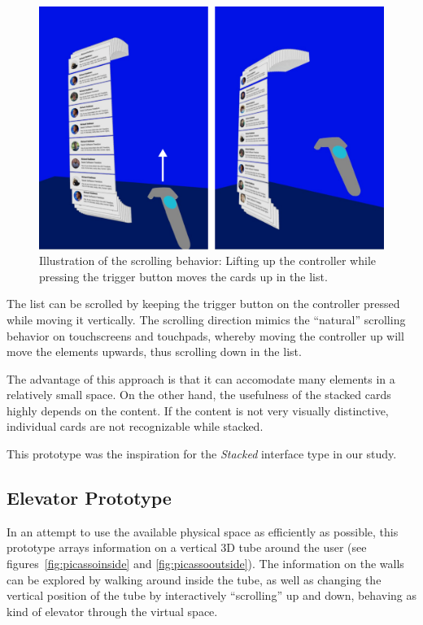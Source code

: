 \documentclass[nobib]{tufte-book} %
\begin{document}
\begin{figure}
  \includegraphics{emailscroll.png}
  \caption{Illustration of the scrolling behavior: Lifting up the controller while pressing the trigger button moves the cards up in the list.}
  \label{fig:emailscroll}
\end{figure}

The list can be scrolled by keeping the trigger button on the controller pressed while moving it vertically. The scrolling direction mimics the ``natural'' scrolling behavior on touchscreens and touchpads, whereby moving the controller up will move the elements upwards, thus scrolling down in the list.

The advantage of this approach is that it can accomodate many elements in a relatively small space. On the other hand, the usefulness of the stacked cards highly depends on the content. If the content is not very visually distinctive, individual cards are not recognizable while stacked.

This prototype was the inspiration for the \emph{Stacked} interface type in our study.

\subsection{Elevator Prototype}
In an attempt to use the available physical space as efficiently as possible, this prototype arrays information on a vertical 3D tube around the user (see figures~\ref{fig:picassoinside} and \ref{fig:picassooutside}). The information on the walls can be explored by walking around inside the tube, as well as changing the vertical position of the tube by interactively ``scrolling'' up and down, behaving as kind of elevator through the virtual space.
\end{document}
